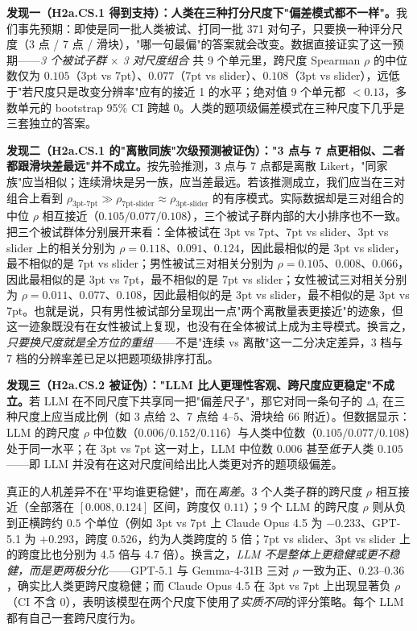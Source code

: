 \documentclass[UTF8,12pt]{ctexart}
\begin{document}
\textbf{发现一（H2a.CS.1 得到支持）：人类在三种打分尺度下"偏差模式都不一样"。}我们事先预期：即使是同一批人类被试、打同一批 371 对句子，只要换一种评分尺度（3 点 / 7 点 / 滑块），"哪一句最偏"的答案就会改变。数据直接证实了这一预期——\emph{3 个被试子群} $\times$ \emph{3 对尺度组合} 共 9 个单元里，跨尺度 Spearman $\rho$ 的中位数仅为 $0.105$（3pt vs 7pt）、$0.077$（7pt vs slider）、$0.108$（3pt vs slider），远低于"若尺度只是改变分辨率"应有的接近 1 的水平；绝对值 9 个单元都 $<0.13$，多数单元的 bootstrap 95\% CI 跨越 0。人类的题项级偏差模式在三种尺度下几乎是三套独立的答案。

\textbf{发现二（H2a.CS.1 的"离散同族"次级预测被证伪）："3 点与 7 点更相似、二者都跟滑块差最远"并不成立。}按先验推测，3 点与 7 点都是离散 Likert，"同家族"应当相似；连续滑块是另一族，应当差最远。若该推测成立，我们应当在三对组合上看到 $\rho_{\text{3pt-7pt}} \gg \rho_{\text{7pt-slider}} \approx \rho_{\text{3pt-slider}}$ 的有序模式。实际数据却是三对组合的中位 $\rho$ 相互接近（$0.105 / 0.077 / 0.108$），三个被试子群内部的大小排序也不一致。把三个被试群体分别展开来看：全体被试在 3pt vs 7pt、7pt vs slider、3pt vs slider 上的相关分别为 $\rho = 0.118$、$0.091$、$0.124$，因此最相似的是 3pt vs slider，最不相似的是 7pt vs slider；男性被试三对相关分别为 $\rho = 0.105$、$0.008$、$0.066$，因此最相似的是 3pt vs 7pt，最不相似的是 7pt vs slider；女性被试三对相关分别为 $\rho = 0.011$、$0.077$、$0.108$，因此最相似的是 3pt vs slider，最不相似的是 3pt vs 7pt。也就是说，只有男性被试部分呈现出一点"两个离散量表更接近"的迹象，但这一迹象既没有在女性被试上复现，也没有在全体被试上成为主导模式。换言之，\emph{只要换尺度就是全方位的重组}——不是"连续 vs 离散"这一二分决定差异，3 档与 7 档的分辨率差已足以把题项级排序打乱。

\textbf{发现三（H2a.CS.2 被证伪）："LLM 比人更理性客观、跨尺度应更稳定"不成立。}若 LLM 在不同尺度下共享同一把"偏差尺子"，那它对同一条句子的 $\Delta_i$ 在三种尺度上应当成比例（如 3 点给 2、7 点给 $4$--$5$、滑块给 $66$ 附近）。但数据显示：LLM 的跨尺度 $\rho$ 中位数（$0.006 / 0.152 / 0.116$）与人类中位数（$0.105 / 0.077 / 0.108$）处于同一水平；在 3pt vs 7pt 这一对上，LLM 中位数 $0.006$ 甚至\emph{低于}人类 $0.105$——即 LLM 并没有在这对尺度间给出比人类更对齐的题项级偏差。

真正的人机差异不在"平均谁更稳健"，而在\emph{离差}。3 个人类子群的跨尺度 $\rho$ 相互接近（全部落在 $[0.008, 0.124]$ 区间，跨度仅 $0.11$）；9 个 LLM 的跨尺度 $\rho$ 则从负到正横跨约 $0.5$ 个单位（例如 3pt vs 7pt 上 Claude Opus 4.5 为 $-0.233$、GPT-5.1 为 $+0.293$，跨度 $0.526$，约为人类跨度的 5 倍；7pt vs slider、3pt vs slider 上的跨度比也分别为 4.5 倍与 4.7 倍）。换言之，\emph{LLM 不是整体上更稳健或更不稳健，而是更两极分化}——GPT-5.1 与 Gemma-4-31B 三对 $\rho$ 一致为正、$0.23$--$0.36$，确实比人类更跨尺度稳健；而 Claude Opus 4.5 在 3pt vs 7pt 上出现显著负 $\rho$（CI 不含 0），表明该模型在两个尺度下使用了\emph{实质不同}的评分策略。每个 LLM 都有自己一套跨尺度行为。
\end{document}
